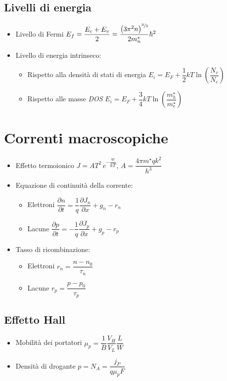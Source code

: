 \documentclass[9pt]{extarticle}
\begin{document}
\subsection{Livelli di energia}
\begin{itemize}
  \item Livello di Fermi \( E_f = \dfrac{E_c + E_v}{2} =\dfrac{ \left(3 \pi^2 n\right)^{\sfrac{2}{3}} }{2 m_n^*} \hbar ^ 2 \)
  \item Livello di energia intrinseco:
        \begin{itemize}
          \item Rispetto alla densità di stati di energia \( E_i = E_F + \dfrac{1}{2} k T \ln \left(\dfrac{N_v}{N_c}\right)\)
          \item Rispetto alle masse \textit{DOS}  \( E_i = E_F + \dfrac{3}{4} k T \ln \left(\dfrac{m ^ \star _ h}{m ^ \star _ e}\right)\)
        \end{itemize}

\end{itemize}

\section{Correnti macroscopiche}
\begin{itemize}
  \item Effetto termoionico \( \displaystyle J = A T ^ 2  \, e ^ {-\dfrac{w}{kT}} \), \( A = \dfrac{4 \pi m ^ \star q k ^2}{h ^ 3} \)
  \item Equazione di continuità della corrente:
        \begin{itemize}
          \item Elettroni  \( \dfrac{\partial n}{\partial t} = \dfrac{1}{q} \dfrac{\partial J_n}{\partial x} + g_n - r_n \)
          \item Lacune \( \dfrac{\partial p}{\partial t} =  -\dfrac{1}{q} \dfrac{\partial J_p}{\partial x} + g_p - r_p \)
        \end{itemize}
  \item Tasso di ricombinazione:
        \begin{itemize}
          \item Elettroni \( r_n = \dfrac{n - n_0}{\tau_n} \)
          \item Lacune \( r_p = \dfrac{p - p_0}{\tau_p} \)
        \end{itemize}
\end{itemize}


\subsection{Effetto Hall}
\begin{itemize}
  \item Mobilità dei portatori \( \mu_p = \dfrac{1}{B} \dfrac{V_H}{V_L} \dfrac{L}{W} \)
  \item Densità di drogante \( p = N_A = \dfrac{j_P}{q \mu_p F} \)
\end{itemize}
\end{document}
